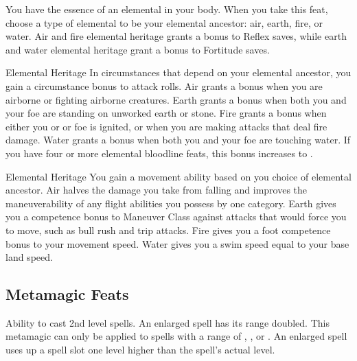 \featben You have the essence of an elemental in your body. When you take this feat, choose a type of elemental to be your elemental ancestor: air, earth, fire, or water. Air and fire elemental heritage grants a  bonus to Reflex saves, while earth and water elemental heritage grant a  bonus to Fortitude saves.

\featpre Elemental Heritage
\featben In circumstances that depend on your elemental ancestor, you gain a  circumstance bonus to attack rolls. Air grants a bonus when you are airborne or fighting airborne creatures. Earth grants a bonus when both you and your foe are standing on unworked earth or stone. Fire grants a bonus when either you or or foe is ignited, or when you are making attacks that deal fire damage. Water grants a bonus when both you and your foe are touching water. If you have four or more elemental bloodline feats, this bonus increases to .

\featpre Elemental Heritage
\featben You gain a movement ability based on you choice of elemental ancestor. Air halves the damage you take from falling and improves the maneuverability of any flight abilities you possess by one category. Earth gives you a  competence bonus to Maneuver Class against attacks that would force you to move, such as bull rush and trip attacks. Fire gives you a  foot competence bonus to your movement speed. Water gives you a swim speed equal to your base land speed.

\subsection{Metamagic Feats}

 Ability to cast 2nd level spells.
 An enlarged spell has its range doubled. This metamagic can only be applied to spells with a range of \rngclose, \rngmed, or \rnglong. An enlarged spell uses up a spell slot one level higher than the spell's actual level.

\begin{comment}
\feat{Extend Spell}{Metamagic}
\parhead{Prerequisite} Caster level 8th.
\parhead{Benefit} An extended spell has its duration increased by one duration category: from Short, to Medium, to Long, to Extreme. This metamagic can only be applied to spells with a duration of \durshort, \durmed, or \durlong. An extended spell uses up a spell slot three levels higher than the spell's actual level.
\end{comment}

